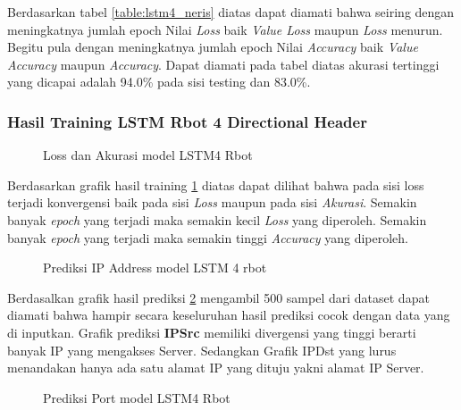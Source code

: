 \documentclass[./skripsi.tex]{subfiles}
\begin{document}
\par Berdasarkan tabel \ref{table:lstm4_neris} diatas dapat diamati bahwa seiring dengan meningkatnya jumlah epoch Nilai \textit{Loss} baik \textit{Value Loss} maupun \textit{Loss} menurun. Begitu pula dengan meningkatnya jumlah epoch Nilai \textit{Accuracy} baik \textit{Value Accuracy} maupun \textit{Accuracy}. Dapat diamati pada tabel diatas akurasi tertinggi yang dicapai adalah 94.0\% pada sisi testing dan 83.0\%.

\subsubsection{Hasil Training LSTM Rbot 4 Directional Header}
\begin{figure}[H]
    \centering
    \caption{Loss dan Akurasi model LSTM4 Rbot}
    \label{fig:lstm4_rbot}
\end{figure}

\par Berdasarkan grafik hasil training \ref{fig:lstm4_rbot} diatas dapat dilihat bahwa pada sisi loss terjadi konvergensi baik pada sisi \textit{Loss} maupun pada sisi \textit{Akurasi}. Semakin banyak \textit{epoch} yang terjadi maka semakin kecil \textit{Loss} yang diperoleh. Semakin banyak \textit{epoch} yang terjadi maka semakin tinggi \textit{Accuracy} yang diperoleh.

\begin{figure}[H]
    \centering
    \caption{Prediksi IP Address model LSTM 4 rbot}
    \label{fig:lstm4_rbot_pred1}
\end{figure}

\par Berdasalkan grafik hasil prediksi \ref{fig:lstm4_rbot_pred1} mengambil 500 sampel dari dataset dapat diamati bahwa hampir secara keseluruhan hasil prediksi cocok dengan data yang di inputkan. Grafik prediksi \textbf{IPSrc} memiliki divergensi yang tinggi berarti banyak IP yang mengakses Server. Sedangkan Grafik IPDst yang lurus menandakan hanya ada satu alamat IP yang dituju yakni alamat IP Server.

\begin{figure}[H]
    \centering
    \caption{Prediksi Port model LSTM4 Rbot}
    \label{fig:lstm4_rbot_pred2}
\end{figure}
\end{document}
